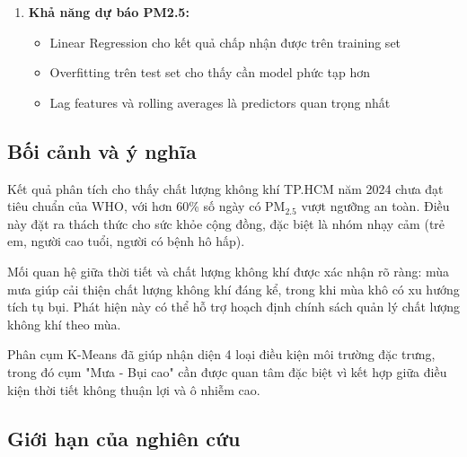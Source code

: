 \documentclass[12pt,a4paper]{article}
\newcommand{\pmtwofive}{PM$_{2.5}$}
\begin{document}
\begin{enumerate}
    \item \textbf{Khả năng dự báo PM2.5:}
    \begin{itemize}
        \item Linear Regression cho kết quả chấp nhận được trên training set
        \item Overfitting trên test set cho thấy cần model phức tạp hơn
        \item Lag features và rolling averages là predictors quan trọng nhất
    \end{itemize}
\end{enumerate}

\subsection{Bối cảnh và ý nghĩa}

Kết quả phân tích cho thấy chất lượng không khí TP.HCM năm 2024 chưa đạt tiêu chuẩn của WHO, với hơn 60\% số ngày có \pmtwofive{} vượt ngưỡng an toàn. Điều này đặt ra thách thức cho sức khỏe cộng đồng, đặc biệt là nhóm nhạy cảm (trẻ em, người cao tuổi, người có bệnh hô hấp).

Mối quan hệ giữa thời tiết và chất lượng không khí được xác nhận rõ ràng: mùa mưa giúp cải thiện chất lượng không khí đáng kể, trong khi mùa khô có xu hướng tích tụ bụi. Phát hiện này có thể hỗ trợ hoạch định chính sách quản lý chất lượng không khí theo mùa.

Phân cụm K-Means đã giúp nhận diện 4 loại điều kiện môi trường đặc trưng, trong đó cụm "Mưa - Bụi cao" cần được quan tâm đặc biệt vì kết hợp giữa điều kiện thời tiết không thuận lợi và ô nhiễm cao.

\subsection{Giới hạn của nghiên cứu}
\end{document}
